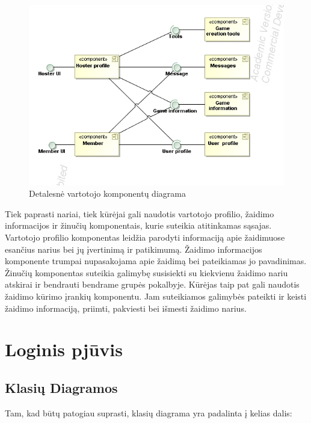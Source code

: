 \documentclass{VUMIFPSkursinis}
\begin{document}
		\begin{figure}[H]
			\centering
			\includegraphics[scale=0.6]{img/UMLComponent3}
			\caption{Detalesnė vartotojo komponentų diagrama}
			\label{img:UMLComponent3}
		\end{figure}
		Tiek paprasti nariai, tiek kūrėjai gali naudotis vartotojo profilio, žaidimo informacijos ir žinučių komponentais, kurie suteikia atitinkamas sąsajas. Vartotojo profilio komponentas leidžia parodyti informaciją apie žaidimuose esančius narius bei jų įvertinimą ir patikimumą. Žaidimo informacijos komponente trumpai nupasakojama apie žaidimą bei pateikiamas jo pavadinimas. Žinučių komponentas suteikia galimybę susisiekti su kiekvienu žaidimo nariu atskirai ir bendrauti bendrame grupės pokalbyje. Kūrėjas taip pat gali naudotis žaidimo kūrimo įrankių komponentu. Jam suteikiamos galimybės pateikti ir keisti žaidimo informaciją, priimti, pakviesti bei išmesti žaidimo narius.

\section{Loginis pjūvis}
	\subsection{Klasių Diagramos}
			Tam, kad būtų patogiau suprasti, klasių diagrama yra padalinta į kelias dalis:
\end{document}

